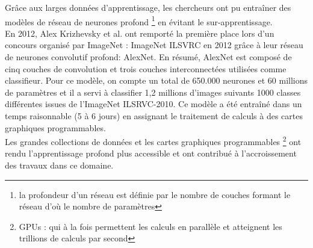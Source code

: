 Grâce aux larges données d'apprentissage, les chercheurs ont pu entraîner des modèles de réseau de neurones profond \footnote{la profondeur d'un réseau est définie par le nombre de couches formant le réseau d'où le nombre de paramètres}  en évitant le sur-apprentissage.\\
En 2012, Alex Krizhevsky et al.\cite{krizhevsky2012imagenet} ont remporté la première place lors d'un concours organisé par ImageNet : ImageNet ILSVRC en 2012 grâce à leur réseau de neurones convolutif profond: AlexNet. En résumé, AlexNet est composé de cinq couches de convolution et trois couches interconnectées utilisées comme classifieur. Pour ce modèle, on compte un total de 650.000 neurones et 60 millions de paramètres et il a servi à classifier 1,2 millions d'images suivants 1000 classes différentes issues de l'ImageNet ILSRVC-2010. Ce modèle a été entraîné dans un temps raisonnable (5 à 6 jours) en assignant  le traitement de calculs à des cartes graphiques programmables. 
\\
Les grandes collections de données et les cartes graphiques programmables \footnote{GPUs : qui à la fois permettent les calculs en parallèle et atteignent les trillions de calculs par second}  ont rendu l'apprentissage profond plus accessible et ont contribué à l'accroissement des travaux dans ce domaine.
	
\smallskip


